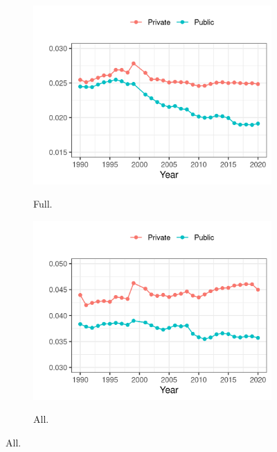 \documentclass[notitlepage,12pt]{article}
\begin{document}
\begin{figure}[!h]
\begin{subfigure}[b]{0.495\textwidth}
        \label{fig:assistant-fte-perprof}
    \end{subfigure}
    \begin{subfigure}[b]{0.495\textwidth}
        \centering
        \caption{Full.}
        \includegraphics[width=\textwidth]{figures/full-fte-perprof.png}
        \label{fig:full-fte-perprof}
    \end{subfigure}
    \begin{subfigure}[b]{0.495\textwidth}
        \centering
        \caption{All.}
        \includegraphics[width=\textwidth]{figures/all-fte-perprof.png}
        \label{fig:all-fte-perprof}
    \end{subfigure}
    \label{fig:fte-perprof}
\end{figure}
\end{document}
